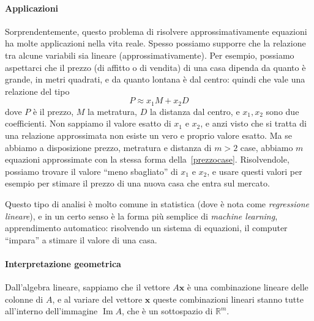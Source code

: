 \documentclass[a4paper]{report}
\theoremstyle{definition}
\theoremstyle{remark}
\newcommand{\x}{\mathbf{x}}
\begin{document}
\paragraph{Applicazioni}
Sorprendentemente, questo problema di risolvere approssimativamente equazioni ha molte applicazioni nella vita reale. Spesso possiamo supporre che la relazione tra alcune variabili sia lineare (approssimativamente). Per esempio, possiamo aspettarci che il prezzo (di affitto o di vendita) di una casa dipenda da quanto è grande, in metri quadrati, e da quanto lontana è dal centro: quindi che vale una relazione del tipo
\begin{equation} \label{prezzocase}
    P \approx x_1 M + x_2 D    
\end{equation}
dove $P$ è il prezzo, $M$ la metratura, $D$ la distanza dal centro, e $x_1,x_2$ sono due coefficienti. Non sappiamo il valore esatto di $x_1$ e $x_2$, e anzi visto che si tratta di una relazione approssimata non esiste un vero e proprio valore esatto. Ma se abbiamo a disposizione prezzo, metratura e distanza di $m>2$ case, abbiamo $m$ equazioni approssimate con la stessa forma della~\eqref{prezzocase}. Risolvendole, possiamo trovare il valore ``meno sbagliato'' di $x_1$ e $x_2$, e usare questi valori per esempio per stimare il prezzo di una nuova casa che entra sul mercato.

Questo tipo di analisi è molto comune in statistica (dove è nota come \emph{regressione lineare}), e in un certo senso è la forma più semplice di \emph{machine learning}, apprendimento automatico: risolvendo un sistema di equazioni, il computer ``impara'' a stimare il valore di una casa.

\paragraph{Interpretazione geometrica} Dall'algebra lineare, sappiamo che il vettore $A\x$ è una combinazione lineare delle colonne di $A$, e al variare del vettore $\x$ queste combinazioni lineari stanno tutte all'interno dell'immagine $\operatorname{Im} A$, che è un sottospazio di $\mathbb{R}^m$.
\begin{center}

    
\end{center}
\end{document}

